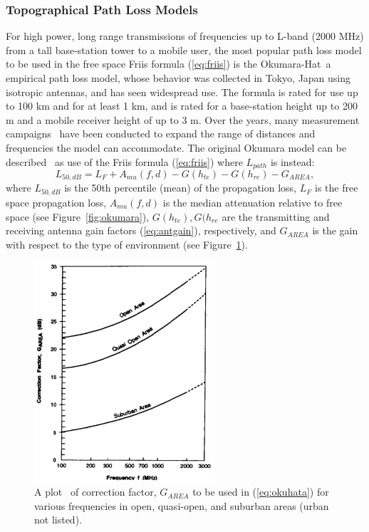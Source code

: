 \subsubsection{Topographical Path Loss Models}
For high power, long range transmissions of frequencies up to L-band (2000 MHz) from a tall base-station tower to a mobile user, the most popular path loss model to be used in the free space Friis formula (\ref{eq:friis}) is the Okumara-Hat~a\cite{oku68} empirical path loss model, whose behavior was collected in Tokyo, Japan using isotropic antennas, and has seen widespread use. The formula is rated for use up to 100 km and for at least 1 km, and is rated for a base-station height up to 200 m and a mobile receiver height of up to 3 m. Over the years, many measurement campaigns~\cite{tsb88tia} have been conducted to expand the range of distances and frequencies the model can accommodate. The original Okumara model can be described~\cite{rappaport1996wireless} as use of the Friis formula (\ref{eq:friis}) where $L_{path}$ is instead:
\begin{equation}
\label{eq:okuhata}
L_{50, dB}  = L_F + A_{mu}(f,d) - G(h_{te})-G(h_{re})-G_{AREA},
\end{equation}
where $L_{50, dB}$ is the 50th percentile (mean) of the propagation loss, $L_F$ is the free space propagation loss, $A_{mu}(f,d)$ is the median attenuation relative to free space (see Figure~\ref{fig:okumara}), $G(h_{te}), G(h_{re}$ are the transmitting and receiving antenna gain factors (\ref{eq:antgain}), respectively, and $G_{AREA}$ is the gain with respect to the type of environment (see Figure~\ref{fig:garea}).

\begin{figure}[ht!]
	\centering	\includegraphics[width=0.6\textwidth,keepaspectratio]{figs/garea.png}
    \caption{A plot~\cite{rappaport1996wireless} of correction factor, $G_{AREA}$ to be used in (\ref{eq:okuhata}) for various frequencies in open, quasi-open, and suburban areas (urban not listed).} 
\label{fig:garea}      
\end{figure}


